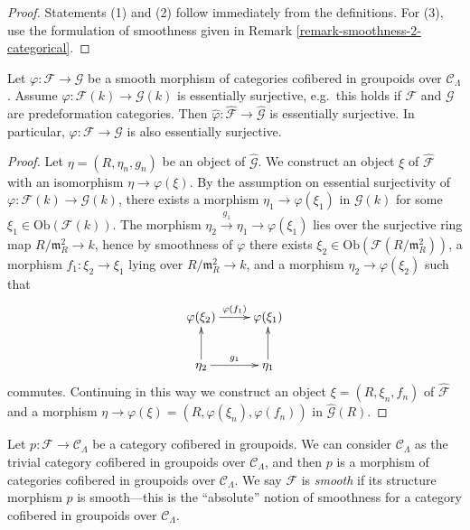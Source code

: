\begin{proof}
Statements (1) and (2) follow immediately from the definitions.  For (3), use 
the formulation of smoothness given in Remark 
\ref{remark-smoothness-2-categorical}.
\end{proof}

\begin{lemma}
\label{lemma-smooth-morphism-essentially-surjective}
Let $\varphi: \mathcal{F} \to \mathcal G$ be a smooth morphism of 
categories cofibered in groupoids over $\mathcal{C}_\Lambda$.  Assume 
$\varphi: \mathcal{F}(k) \to \mathcal G(k)$ is essentially surjective, 
e.g.\ this holds if $\mathcal{F}$ and $\mathcal G$ are predeformation 
categories. Then $\widehat{\varphi}: \widehat{\mathcal{F}} \to 
\widehat{\mathcal G}$ is essentially surjective.  In particular, $\varphi: 
\mathcal{F} \to \mathcal G$ is also essentially surjective.
\end{lemma}

\begin{proof}
Let $\eta = (R,\eta_{n},g_n)$ be an object of $\widehat{\mathcal G}$.  We 
construct an object $\xi$ of $\widehat{\mathcal{F}}$ with an isomorphism $\eta 
\to \varphi(\xi)$. By the assumption on essential surjectivity of 
$\varphi: \mathcal{F}(k) \to \mathcal G(k)$, there exists a morphism 
$\eta_{1} \to \varphi(\xi_1)$ in $\mathcal G(k)$ for some $\xi_{1} \in 
\text{Ob}(\mathcal{F}(k))$.  The morphism $\eta_{2} \xrightarrow{g_1} 
\eta_{1} \to  \varphi(\xi_1)$ lies over the surjective ring map 
$R/\mathfrak{m}_R^2 \to k$, hence by smoothness of $\varphi$ there 
exists $\xi_{2} \in \text{Ob}(\mathcal{F}(R/\mathfrak{m}_R^2))$, a 
morphism $f_1: \xi_{2} \to \xi_{1}$ lying over $R/\mathfrak{m}_R^2 
\to k$, and a morphism $\eta_{2} \to \varphi(\xi_2)$ such that 
\[
\xymatrix{
\varphi(\xi_{2})  \ar[r]^{\varphi(f_1)} &  \varphi(\xi_{1})   \\
\eta_{2}   \ar[u] \ar[r]^{g_1}  & \eta_1  \ar[u] \\
}
\]
commutes.  Continuing in this way we construct an object $\xi = 
(R,\xi_{n},f_{n})$ of $\widehat{\mathcal{F}}$ and a morphism $\eta \to 
\varphi(\xi) = (R,\varphi(\xi_n),\varphi(f_{n}))$ in $\widehat{\mathcal G}(R)$.
\end{proof}

\begin{remark}
\label{remark-cofibered-groupoid-projection-smooth}
Let $p: \mathcal{F} \to \mathcal{C}_\Lambda$ be a category cofibered in 
groupoids. We can consider $\mathcal{C}_\Lambda$ as the trivial category 
cofibered in groupoids over $\mathcal{C}_\Lambda$, and then $p$ is a morphism 
of categories cofibered in groupoids over $\mathcal{C}_\Lambda$.  We say 
$\mathcal{F}$ is {\it smooth} if its structure morphism $p$ is smooth---this is 
the ``absolute'' notion of smoothness for a category cofibered in groupoids 
over $\mathcal{C}_\Lambda$.
\end{remark}

